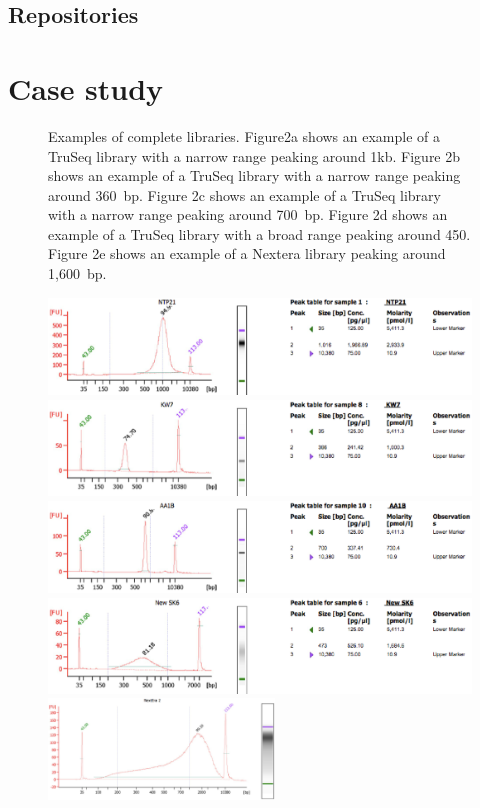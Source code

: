 \documentclass[graybox]{svmult}
\begin{document}
\subsection{Repositories}
\label{sec:5repos}

\section{Case study}
\label{sec:6}

%
\begin{figure}
\caption{Examples of complete libraries. Figure2a shows an example of a TruSeq library with a narrow range peaking around 1kb. Figure 2b shows an example of a TruSeq library with a narrow range peaking around 360~bp. Figure 2c shows an example of a TruSeq library with a narrow range peaking around 700~bp. Figure 2d shows an example of a TruSeq library with a broad range peaking around 450. Figure 2e shows an example of a Nextera library peaking around 1,600~bp.  }
\includegraphics[width=12cm]{imgs/image2.eps}
\includegraphics[width=12cm]{imgs/image3.eps}
\includegraphics[width=12cm]{imgs/image4.eps}
\includegraphics[width=12cm]{imgs/image5.eps}
\includegraphics[width=6cm]{imgs/image6.eps}
%
\caption{ }
\label{fig:2}       %
\end{figure}
\end{document}
